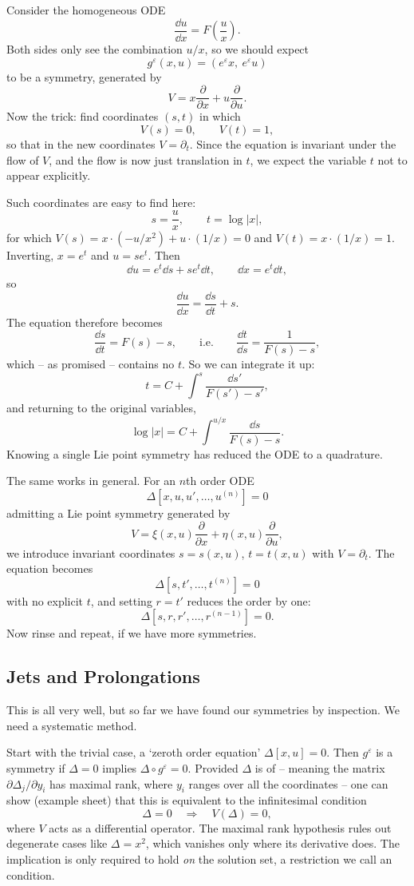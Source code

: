 \documentclass[a4paper]{scrartcl}
\begin{document}
\begin{example}
	Consider the homogeneous ODE
	$$
	\frac{\dd u}{\dd x} = F\left(\frac{u}{x}\right).
	$$
	Both sides only see the combination $u/x$, so we should expect
	$$
	g^\varepsilon(x,u) = \left(e^\varepsilon x,\ e^\varepsilon u\right)
	$$
	to be a symmetry, generated by
	$$
	V = x\frac{\partial}{\partial x} + u\frac{\partial}{\partial u}.
	$$
	Now the trick: find coordinates $(s,t)$ in which
	$$
	V(s) = 0, \qquad V(t) = 1,
	$$
	so that in the new coordinates $V = \partial_t$. Since the equation is invariant under the flow of $V$, and the flow is now just translation in $t$, we expect the variable $t$ not to appear explicitly.

	Such coordinates are easy to find here:
	$$
	s = \frac{u}{x}, \qquad t = \log|x|,
	$$
	for which $V(s) = x\cdot(-u/x^2) + u\cdot(1/x) = 0$ and $V(t) = x\cdot(1/x) = 1$. Inverting, $x = e^t$ and $u = se^t$. Then
	$$
	\dd u = e^t\dd s + se^t\dd t, \qquad \dd x = e^t\dd t,
	$$
	so
	$$
	\frac{\dd u}{\dd x} = \frac{\dd s}{\dd t} + s.
	$$
	The equation therefore becomes
	$$
	\frac{\dd s}{\dd t} = F(s) - s, \qquad\text{i.e.}\qquad \frac{\dd t}{\dd s} = \frac{1}{F(s)-s},
	$$
	which -- as promised -- contains no $t$. So we can integrate it up:
	$$
	t = C + \int^s\frac{\dd s'}{F(s')-s'},
	$$
	and returning to the original variables,
	$$
	\log|x| = C + \int^{u/x}\frac{\dd s}{F(s)-s}.
	$$
	Knowing a single Lie point symmetry has reduced the ODE to a quadrature.
\end{example}

The same works in general. For an $n$th order ODE
$$
\Delta\left[x,u,u',\dots,u^{(n)}\right] = 0
$$
admitting a Lie point symmetry generated by
$$
V = \xi(x,u)\frac{\partial}{\partial x} + \eta(x,u)\frac{\partial}{\partial u},
$$
we introduce invariant coordinates $s = s(x,u)$, $t = t(x,u)$ with $V = \partial_t$. The equation becomes
$$
\Delta\left[s, t', \dots, t^{(n)}\right] = 0
$$
with no explicit $t$, and setting $r = t'$ reduces the order by one:
$$
\Delta\left[s,r,r',\dots,r^{(n-1)}\right] = 0.
$$
Now rinse and repeat, if we have more symmetries.

\subsection{Jets and Prolongations}

This is all very well, but so far we have found our symmetries by inspection. We need a systematic method.

Start with the trivial case, a `zeroth order equation' $\Delta[x,u] = 0$. Then $g^\varepsilon$ is a symmetry if $\Delta = 0$ implies $\Delta\circ g^\varepsilon = 0$. Provided $\Delta$ is of  -- meaning the matrix $\partial\Delta_j/\partial y_i$ has maximal rank, where $y_i$ ranges over all the coordinates -- one can show (example sheet) that this is equivalent to the infinitesimal condition
$$
\Delta = 0 \quad\Longrightarrow\quad V(\Delta) = 0,
$$
where $V$ acts as a differential operator. The maximal rank hypothesis rules out degenerate cases like $\Delta = x^2$, which vanishes only where its derivative does. The implication is only required to hold \emph{on} the solution set, a restriction we call an  condition.
\end{document}
